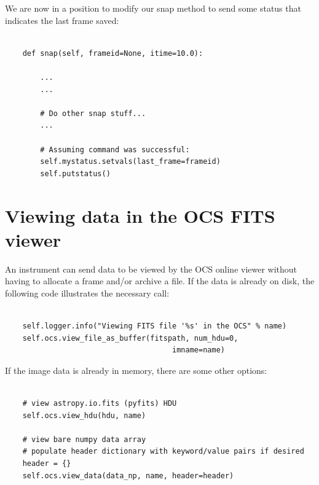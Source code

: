 \documentclass[11pt]{report}
\begin{document}
We are now in a position to modify our snap method to send some status
that indicates the last frame saved: 
\begin{verbatim}

    def snap(self, frameid=None, itime=10.0):

        ...
        ...

        # Do other snap stuff...
        ...

        # Assuming command was successful:
        self.mystatus.setvals(last_frame=frameid)
        self.putstatus()

\end{verbatim}

\section{Viewing data in the OCS FITS viewer}
An instrument can send data to be viewed by the OCS online viewer
without having to allocate a frame and/or archive a file. If the data is
already on disk, the following code illustrates the necessary call: 
\begin{verbatim}

    self.logger.info("Viewing FITS file '%s' in the OCS" % name)
    self.ocs.view_file_as_buffer(fitspath, num_hdu=0,
                                      imname=name)
\end{verbatim}

If the image data is already in memory, there are some other options:
\begin{verbatim}

    # view astropy.io.fits (pyfits) HDU
    self.ocs.view_hdu(hdu, name)

    # view bare numpy data array 
    # populate header dictionary with keyword/value pairs if desired
    header = {}
    self.ocs.view_data(data_np, name, header=header)

\end{verbatim}
\end{document}
